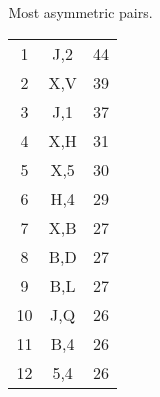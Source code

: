 \documentclass[professionalfonts,hyperref={pdfpagelabels=false,colorlinks=true,linkcolor=cyan}]{beamer}
\begin{document}
\begin{frame}
  \label{morsecode:fig_b}
  \begin{columns}
    \begin{column}{0.7\textwidth}
      \centering
      \hyperlink{morsecode:fig}{}
    \end{column}
  
  \begin{column}{0.35\textwidth}
    Most asymmetric pairs.
    \begin{tabular}{ccc}
      1 & J,2 & 44 \\
      2 & X,V & 39 \\ 
      3 & J,1 & 37 \\
      4 & X,H & 31 \\
      5 & X,5 & 30 \\
      6 & H,4 & 29 \\
      7 & X,B & 27 \\
      8 & B,D & 27 \\
      9 & B,L & 27 \\
      10 & J,Q & 26 \\
      11 & B,4 & 26 \\ 
      12 & 5,4 & 26 \\
    \end{tabular}
  \end{column}
  \end{columns}
\end{frame}
\end{document}
